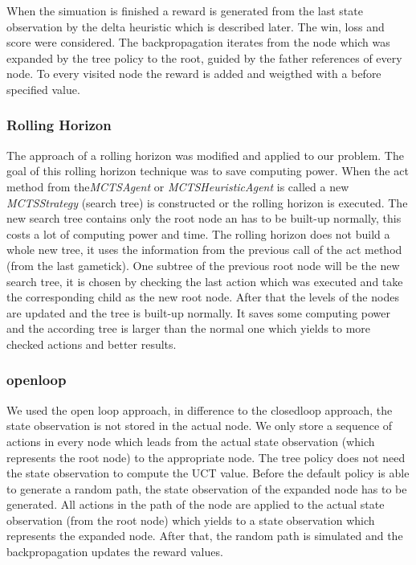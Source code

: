 
When the simuation is finished a reward is generated from the last state observation by the delta heuristic which is described later. The win, loss and score were considered.
The backpropagation iterates from the node which was expanded by the tree policy to the root, guided by the father references of every node. To every visited node the reward is added and weigthed with a before specified value.

\subsubsection{Rolling Horizon}

The approach of a rolling horizon was modified and applied to our problem. The goal of this rolling horizon technique was to save computing power. 
When the act method from the\textit{MCTSAgent} or \textit{MCTSHeuristicAgent} is called a new \textit{MCTSStrategy} (search tree) is constructed or the rolling horizon is executed. The new search tree contains only the root node an has to be built-up normally, this costs a lot of computing power and time. The rolling horizon does not build a whole new tree, it uses the information from the previous call of the act method (from the last gametick). 
One subtree of the previous root node will be the new search tree, it is chosen by checking the last action which was executed and take the corresponding child as the new root node.
After that the levels of the nodes are updated and the tree is built-up normally. It saves some computing power and the according tree is larger than the normal one which yields to more checked actions and better results.  

\subsubsection{openloop}

We used the open loop approach, in difference to the closedloop approach, the state observation is not stored in the actual node. We only store a sequence of actions in every node which leads from the actual state observation (which represents the root node) to the appropriate node. The tree policy does not need the state observation to compute the \ac{UCT} value. 
Before the default policy is able to generate a random path, the state observation of the expanded node has to be generated. All actions in the path of the node are applied to the actual state observation (from the root node) which yields to a state observation which represents the expanded node. After that, the random path is simulated and the backpropagation updates the reward values.

